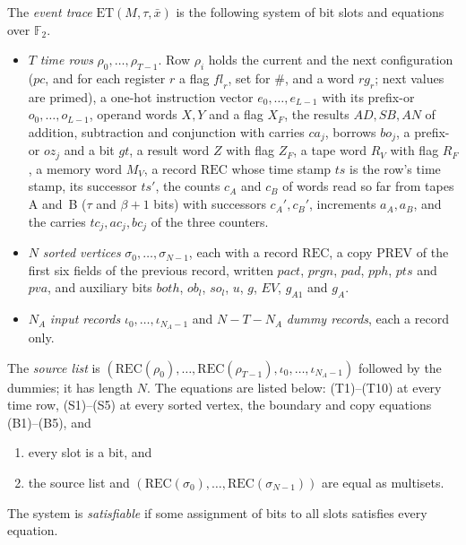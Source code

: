 \begin{definition}
The \emph{event trace} \(\mathrm{ET}(M,\tau,\bar x)\) is the following
system of bit slots and equations over \(\mathbb F_2\).
\begin{itemize}
\item \(T\) \emph{time rows} \(\rho_0,\ldots,\rho_{T-1}\). Row \(\rho_i\)
holds the current and the next configuration (\(\mathit{pc}\), and for
each register \(r\) a flag \(\mathit{fl}_r\), set for \(\#\), and a word
\(\mathit{rg}_r\); next values are primed), a one-hot instruction vector
\(e_0,\ldots,e_{L-1}\) with its prefix-or \(o_0,\ldots,o_{L-1}\), operand
words \(X,Y\) and a flag \(X_F\), the results \(\mathit{AD},\mathit{SB},
\mathit{AN}\) of addition, subtraction and conjunction with carries
\(\mathit{ca}_j\), borrows \(\mathit{bo}_j\), a prefix-or
\(\mathit{oz}_j\) and a bit \(\mathit{gt}\), a result word \(Z\) with flag
\(Z_F\), a tape word \(R_V\) with flag \(R_F\), a memory word \(M_V\),
a record \(\mathrm{REC}\) whose time stamp \(\mathit{ts}\) is the row's
time stamp, its successor \(\mathit{ts}'\), the counts \(c_A\) and
\(c_B\) of words read so far from tapes A and~B (\(\tau\) and
\(\beta+1\) bits) with successors \(c_A',c_B'\), increments \(a_A,a_B\),
and the carries \(\mathit{tc}_j,\mathit{ac}_j,\mathit{bc}_j\) of the
three counters.
\item \(N\) \emph{sorted vertices} \(\sigma_0,\ldots,\sigma_{N-1}\), each
with a record \(\mathrm{REC}\), a copy \(\mathrm{PREV}\) of the first
six fields of the previous record, written \(\mathit{pact}\),
\(\mathit{prgn}\), \(\mathit{pad}\), \(\mathit{pph}\), \(\mathit{pts}\)
and \(\mathit{pva}\), and auxiliary bits \(\mathit{both}\),
\(\mathit{ob}_l\), \(\mathit{so}_l\), \(u\), \(g\), \(\mathit{EV}\),
\(g_{A1}\) and \(g_A\).
\item \(N_A\) \emph{input records} \(\iota_0,\ldots,\iota_{N_A-1}\) and
\(N-T-N_A\) \emph{dummy records}, each a record only.
\end{itemize}
The \emph{source list} is \((\mathrm{REC}(\rho_0),\ldots,
\mathrm{REC}(\rho_{T-1}),\iota_0,\ldots,\iota_{N_A-1})\) followed by the
dummies; it has length \(N\). The equations are listed below:
(T1)--(T10) at every time row, (S1)--(S5) at every sorted vertex, the
boundary and copy equations (B1)--(B5), and
\begin{enumerate}[label=(\Alph*),start=7]
\item every slot is a bit, and
\setcounter{enumi}{15}
\item the source list and \((\mathrm{REC}(\sigma_0),\ldots,
\mathrm{REC}(\sigma_{N-1}))\) are equal as multisets.
\end{enumerate}
The system is \emph{satisfiable} if some assignment of bits to all
slots satisfies every equation.
\end{definition}

